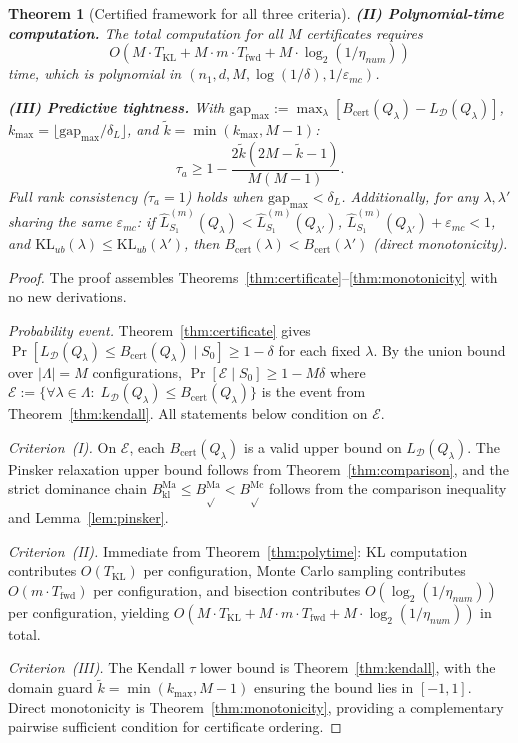 \documentclass[11pt,a4paper]{article}
\newtheorem{theorem}{Theorem}
\newcommand{\kl}{\mathrm{kl}}
\newcommand{\KL}{\mathrm{KL}}
\newcommand{\cD}{\mathcal{D}}
\newcommand{\gapmax}{\mathrm{gap}_{\max}}
\begin{document}
\begin{theorem}[Certified framework for all three criteria]
\medskip

\noindent\textbf{(II) Polynomial-time computation.} The total computation for all $M$ certificates requires
\[
O\!\left(M \cdot T_{\mathrm{KL}} + M \cdot m \cdot T_{\mathrm{fwd}} + M \cdot \log_2(1/\eta_{num})\right)
\]
time, which is polynomial in $(n_1, d, M, \log(1/\delta), 1/\varepsilon_{mc})$.

\medskip

\noindent\textbf{(III) Predictive tightness.} With $\gapmax := \max_\lambda [B_{\mathrm{cert}}(Q_\lambda) - L_\cD(Q_\lambda)]$, $k_{\max} = \lfloor \gapmax / \delta_L \rfloor$, and $\tilde{k} = \min(k_{\max}, M-1)$:
\[
\tau_a \ge 1 - \frac{2\tilde{k}(2M - \tilde{k} - 1)}{M(M-1)}.
\]
Full rank consistency ($\tau_a = 1$) holds when $\gapmax < \delta_L$. Additionally, for any $\lambda, \lambda'$ sharing the same $\varepsilon_{mc}$: if $\hat{L}_{S_1}^{(m)}(Q_\lambda) < \hat{L}_{S_1}^{(m)}(Q_{\lambda'})$, $\hat{L}_{S_1}^{(m)}(Q_{\lambda'}) + \varepsilon_{mc} < 1$, and $\KL_{ub}(\lambda) \le \KL_{ub}(\lambda')$, then $B_{\mathrm{cert}}(\lambda) < B_{\mathrm{cert}}(\lambda')$ (direct monotonicity).
\end{theorem}

\begin{proof}
The proof assembles Theorems~\ref{thm:certificate}--\ref{thm:monotonicity} with no new derivations.

\emph{Probability event.} Theorem~\ref{thm:certificate} gives $\Pr[L_\cD(Q_\lambda) \le B_{\mathrm{cert}}(Q_\lambda) \mid S_0] \ge 1 - \delta$ for each fixed $\lambda$. By the union bound over $|\Lambda| = M$ configurations, $\Pr[\mathcal{E} \mid S_0] \ge 1 - M\delta$ where $\mathcal{E} := \{\forall \lambda \in \Lambda:\; L_\cD(Q_\lambda) \le B_{\mathrm{cert}}(Q_\lambda)\}$ is the event from Theorem~\ref{thm:kendall}. All statements below condition on $\mathcal{E}$.

\emph{Criterion~(I).} On $\mathcal{E}$, each $B_{\mathrm{cert}}(Q_\lambda)$ is a valid upper bound on $L_\cD(Q_\lambda)$. The Pinsker relaxation upper bound follows from Theorem~\ref{thm:comparison}, and the strict dominance chain $B_{\kl}^{\mathrm{Ma}} \le B_{\sqrt{}}^{\mathrm{Ma}} < B_{\sqrt{}}^{\mathrm{Mc}}$ follows from the comparison inequality and Lemma~\ref{lem:pinsker}.

\emph{Criterion~(II).} Immediate from Theorem~\ref{thm:polytime}: KL computation contributes $O(T_{\mathrm{KL}})$ per configuration, Monte Carlo sampling contributes $O(m \cdot T_{\mathrm{fwd}})$ per configuration, and bisection contributes $O(\log_2(1/\eta_{num}))$ per configuration, yielding $O(M \cdot T_{\mathrm{KL}} + M \cdot m \cdot T_{\mathrm{fwd}} + M \cdot \log_2(1/\eta_{num}))$ in total.

\emph{Criterion~(III).} The Kendall $\tau$ lower bound is Theorem~\ref{thm:kendall}, with the domain guard $\tilde{k} = \min(k_{\max}, M-1)$ ensuring the bound lies in $[-1,1]$. Direct monotonicity is Theorem~\ref{thm:monotonicity}, providing a complementary pairwise sufficient condition for certificate ordering.
\end{proof}
\end{document}
